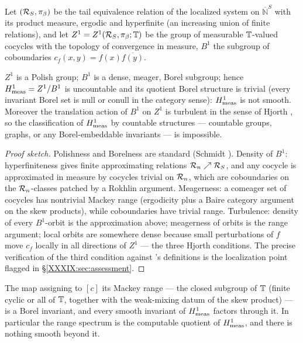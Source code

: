 Let $(\mathcal{R}_S,\pi_\beta)$ be the tail equivalence relation of the localized system on
$\overline{\mathbb N}^S$ with its product measure, ergodic and hyperfinite (an increasing
union of finite relations), and let $Z^1=Z^1(\mathcal{R}_S,\pi_\beta;\mathbb{T})$ be the group of
measurable $\mathbb{T}$-valued cocycles with the topology of convergence in measure, $B^1$ the
subgroup of coboundaries $c_f(x,y)=f(x)\overline{f(y)}$.

\begin{theorem}\label{XXXIX:thm:structure}
$Z^1$ is a Polish group; $B^1$ is a dense, meager, Borel subgroup; hence
$H^1_{\mathrm{meas}}=Z^1/B^1$ is uncountable and its quotient Borel structure is trivial (every
invariant Borel set is null or conull in the category sense): $H^1_{\mathrm{meas}}$ is not smooth.
Moreover the translation action of $B^1$ on $Z^1$ is turbulent in the sense of Hjorth
\cite{Hjorth}, so the classification of $H^1_{\mathrm{meas}}$ by countable structures --- countable
groups, graphs, or any Borel-embeddable invariants --- is impossible.
\end{theorem}

\begin{proof}[Proof sketch]
Polishness and Borelness are standard (Schmidt \cite{Schmidt}). Density of $B^1$:
hyperfiniteness gives finite approximating relations $\mathcal{R}_n\nearrow\mathcal{R}_S$, and any cocycle
is approximated in measure by cocycles trivial on $\mathcal{R}_n$, which are coboundaries on the
$\mathcal{R}_n$-classes patched by a Rokhlin argument. Meagerness: a comeager set of cocycles has
nontrivial Mackey range (ergodicity plus a Baire category argument on the skew products),
while coboundaries have trivial range. Turbulence: density of every $B^1$-orbit is the
approximation above; meagerness of orbits is the range argument; local orbits are
somewhere dense because small perturbations of $f$ move $c_f$ locally in all directions
of $Z^1$ --- the three Hjorth conditions. The precise verification of the third
condition against \cite{Hjorth}'s definitions is the localization point flagged in
\S\ref{XXXIX:sec:assessment}.
\end{proof}

\begin{proposition}\label{XXXIX:prop:residues}
The map assigning to $[c]$ its Mackey range --- the closed subgroup of $\mathbb{T}$ (finite
cyclic or all of $\mathbb{T}$, together with the weak-mixing datum of the skew product) --- is a
Borel invariant, and every smooth invariant of $H^1_{\mathrm{meas}}$ factors through it. In
particular the range spectrum is the computable quotient of $H^1_{\mathrm{meas}}$, and there is
nothing smooth beyond it.
\end{proposition}

